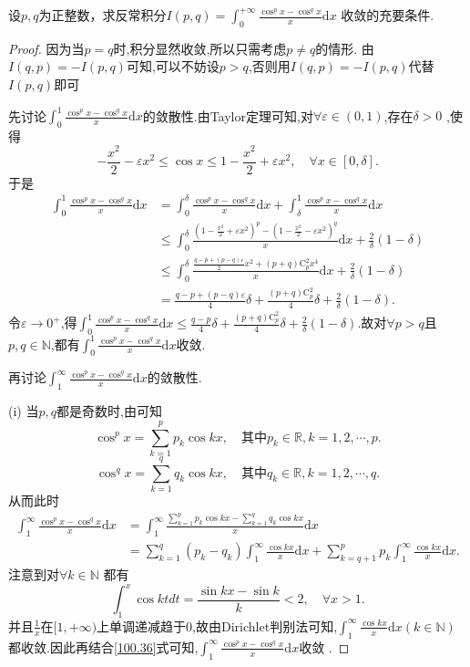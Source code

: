 \documentclass[../../main.tex]{subfiles}
\begin{document}
\begin{example}
设\(p,q\)为正整数，求反常积分$I(p,q)=\int_{0}^{+\infty}\frac{\cos^{p}x - \cos^{q}x}{x}\mathrm{d}x$
收敛的充要条件.
\end{example}
\begin{proof}
因为当$p=q$时,积分显然收敛,所以只需考虑$p\ne q$的情形. 由$I(q,p) =-I(p,q)$可知,可以不妨设$p>q$,否则用$I(q,p) =-I(p,q)$代替$I(p,q)$即可

先讨论$\int_0^1{\frac{\cos ^px-\cos ^qx}{x}\mathrm{d}x}$的敛散性.由Taylor定理可知,对$\forall \varepsilon \in (0,1)$,存在$\delta >0$ ,使得  
\[
-\frac{x^2}{2}-\varepsilon x^2\leqslant \cos x\leqslant 1-\frac{x^2}{2}+\varepsilon x^2 ,\quad \forall x\in [0,\delta].
\]  
于是  
\begin{align*}
\int_0^1{\frac{\cos ^px-\cos ^qx}{x}\mathrm{d}x}&=\int_0^{\delta}{\frac{\cos ^px-\cos ^qx}{x}\mathrm{d}x}+\int_{\delta}^1{\frac{\cos ^px-\cos ^qx}{x}\mathrm{d}x}\\
&\leqslant \int_0^{\delta}{\frac{(1-\frac{x^2}{2}+\varepsilon x^2)^p-(1-\frac{x^2}{2}-\varepsilon x^2)^q}{x}\mathrm{d}x}+\frac{2}{\delta}(1-\delta)\\
&\leqslant \int_0^{\delta}{\frac{\frac{q-p+(p-q)\varepsilon}{2}x^2+(p+q)\mathrm{C}_{p}^{2}x^4}{x}\mathrm{d}x}+\frac{2}{\delta}(1-\delta)\\
&=\frac{q-p+(p-q)\varepsilon}{4}\delta +\frac{(p+q)\mathrm{C}_{p}^{2}}{4}\delta +\frac{2}{\delta}(1-\delta).
\end{align*}  
令$\varepsilon \rightarrow 0^+$,得$\int_0^1{\frac{\cos ^px-\cos ^qx}{x}\mathrm{d}x}\leqslant \frac{q-p}{4}\delta +\frac{(p+q)\mathrm{C}_{p}^{2}}{4}\delta +\frac{2}{\delta}(1-\delta)$.故对$\forall p>q$且$p,q\in \mathbb{N}$,都有$\int_0^1{\frac{\cos ^px-\cos ^qx}{x}\mathrm{d}x}$收敛.

再讨论$\int_1^{\infty}{\frac{\cos ^px-\cos ^qx}{x}\mathrm{d}x}$的敛散性.

(i) 当$p,q$都是奇数时,由可知  
$$
\cos ^px=\sum_{k=1}^p{p_k\cos kx} ,\quad \text{其中}p_k\in \mathbb{R} , k=1,2,\cdots,p.
$$  
$$
\cos ^qx=\sum_{k=1}^q{q_k\cos kx} ,\quad \text{其中}q_k\in \mathbb{R} , k=1,2,\cdots,q.
$$  
从而此时  
\begin{align*}
\int_1^{\infty}{\frac{\cos ^px-\cos ^qx}{x}\mathrm{d}x}&=\int_1^{\infty}{\frac{\sum\limits_{k=1}^p{p_k\cos kx}-\sum\limits_{k=1}^q{q_k\cos kx}}{x}\mathrm{d}x}\\
&=\sum\limits_{k=1}^q{(p_k-q_k)\int_1^{\infty}{\frac{\cos kx}{x}\mathrm{d}x}}+\sum\limits_{k=q+1}^p{p_k\int_1^{\infty}{\frac{\cos kx}{x}\mathrm{d}x}} .\label{100.36}
\end{align*}  
注意到对$\forall k\in \mathbb{N}$ 都有  
$$
\int_1^x{\cos ktdt}=\frac{\sin kx-\sin k}{k}<2 ,\quad \forall x>1.
$$  
并且$\frac{1}{x}$在$[1,+\infty)$上单调递减趋于0,故由Dirichlet判别法可知,$\int_1^{\infty}{\frac{\cos kx}{x}\mathrm{d}x}(k\in \mathbb{N})$都收敛.因此再结合\eqref{100.36}式可知,$\int_1^{\infty}{\frac{\cos ^px-\cos ^qx}{x}\mathrm{d}x}$收敛 . 


\end{proof}
\end{document}

